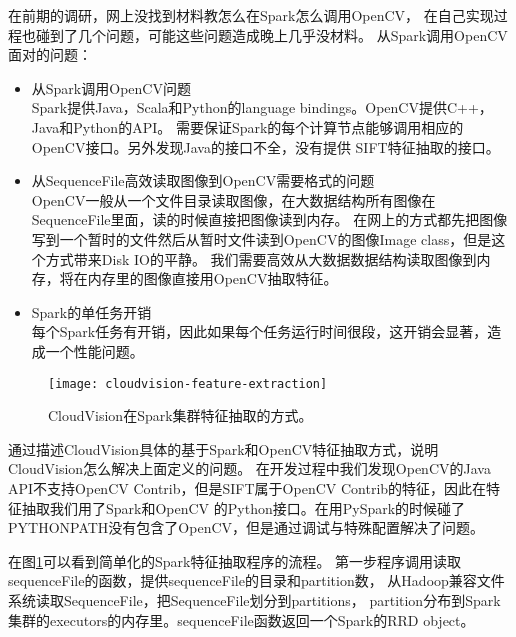 在前期的调研，网上没找到材料教怎么在Spark怎么调用OpenCV，
在自己实现过程也碰到了几个问题，可能这些问题造成晚上几乎没材料。
从Spark调用OpenCV面对的问题：
\begin{itemize}
  \item 从Spark调用OpenCV问题 \\
        Spark提供Java，Scala和Python的language bindings。OpenCV提供C++，Java和Python的API。
        需要保证Spark的每个计算节点能够调用相应的OpenCV接口。另外发现Java的接口不全，没有提供
        SIFT特征抽取的接口。
  \item 从SequenceFile高效读取图像到OpenCV需要格式的问题 \\
        OpenCV一般从一个文件目录读取图像，在大数据结构所有图像在SequenceFile里面，读的时候直接把图像读到内存。
        在网上的方式都先把图像写到一个暂时的文件然后从暂时文件读到OpenCV的图像Image class，但是这个方式带来Disk IO的平静。
        我们需要高效从大数据数据结构读取图像到内存，将在内存里的图像直接用OpenCV抽取特征。
  \item Spark的单任务开销 \\
        每个Spark任务有开销，因此如果每个任务运行时间很段，这开销会显著，造成一个性能问题。
\end{itemize}


\begin{figure}[h]
  \centering
    \texttt{[image: cloudvision-feature-extraction]}
  \caption{CloudVision在Spark集群特征抽取的方式。}
  \label{fig:cloudvision-feature-extraction}
\end{figure}
通过描述CloudVision具体的基于Spark和OpenCV特征抽取方式，说明CloudVision怎么解决上面定义的问题。
在开发过程中我们发现OpenCV的Java
API不支持OpenCV Contrib，但是SIFT属于OpenCV Contrib的特征，因此在特征抽取我们用了Spark和OpenCV
的Python接口。在用PySpark的时候碰了PYTHONPATH没有包含了OpenCV，但是通过调试与特殊配置解决了问题。

在图\ref{fig:cloudvision-feature-extraction}可以看到简单化的Spark特征抽取程序的流程。
第一步程序调用读取sequenceFile的函数，提供sequenceFile的目录和partition数，
从Hadoop兼容文件系统读取SequenceFile，把SequenceFile划分到partitions，
partition分布到Spark集群的executors的内存里。sequenceFile函数返回一个Spark的RRD object。

